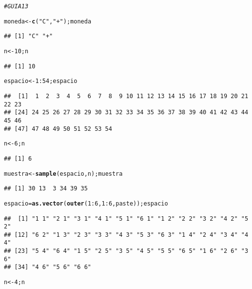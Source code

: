 \documentclass{article}\usepackage[]{graphicx}\usepackage[]{color}
\makeatletter
\newcommand{\hlnum}[1]{\textcolor[rgb]{0.686,0.059,0.569}{#1}}%
\newcommand{\hlstr}[1]{\textcolor[rgb]{0.192,0.494,0.8}{#1}}%
\newcommand{\hlcom}[1]{\textcolor[rgb]{0.678,0.584,0.686}{\textit{#1}}}%
\newcommand{\hlopt}[1]{\textcolor[rgb]{0,0,0}{#1}}%
\newcommand{\hlstd}[1]{\textcolor[rgb]{0.345,0.345,0.345}{#1}}%
\newcommand{\hlkwb}[1]{\textcolor[rgb]{0.69,0.353,0.396}{#1}}%
\newcommand{\hlkwd}[1]{\textcolor[rgb]{0.737,0.353,0.396}{\textbf{#1}}}%
\newenvironment{kframe}{%
 \def\at@end@of@kframe{}%
 \ifinner\ifhmode%
  \def\at@end@of@kframe{\end{minipage}}%
  \begin{minipage}{\columnwidth}%
 \fi\fi%
 \def\FrameCommand##1{\hskip\@totalleftmargin \hskip-\fboxsep
 \colorbox{shadecolor}{##1}\hskip-\fboxsep
     \hskip-\linewidth \hskip-\@totalleftmargin \hskip\columnwidth}%
 \MakeFramed {\advance\hsize-\width
   \@totalleftmargin\z@ \linewidth\hsize
   \@setminipage}}%
 {\par\unskip\endMakeFramed%
 \at@end@of@kframe}
\newenvironment{knitrout}{}{} %
\makeatother
\begin{document}
\begin{knitrout}
\color{fgcolor}\begin{kframe}
\begin{alltt}
\hlcom{# GUIA 13}

\hlstd{moneda} \hlkwb{<-} \hlkwd{c}\hlstd{(}\hlstr{"C"}\hlstd{,} \hlstr{"+"}\hlstd{); moneda}
\end{alltt}
\begin{verbatim}
## [1] "C" "+"
\end{verbatim}
\begin{alltt}
\hlstd{n} \hlkwb{<-} \hlnum{10}\hlstd{; n}
\end{alltt}
\begin{verbatim}
## [1] 10
\end{verbatim}
\begin{alltt}
\hlstd{espacio} \hlkwb{<-} \hlnum{1}\hlopt{:}\hlnum{54}\hlstd{;espacio}
\end{alltt}
\begin{verbatim}
##  [1]  1  2  3  4  5  6  7  8  9 10 11 12 13 14 15 16 17 18 19 20 21 22 23
## [24] 24 25 26 27 28 29 30 31 32 33 34 35 36 37 38 39 40 41 42 43 44 45 46
## [47] 47 48 49 50 51 52 53 54
\end{verbatim}
\begin{alltt}
\hlstd{n} \hlkwb{<-} \hlnum{6}\hlstd{; n}
\end{alltt}
\begin{verbatim}
## [1] 6
\end{verbatim}
\begin{alltt}
\hlstd{muestra} \hlkwb{<-} \hlkwd{sample}\hlstd{(espacio, n); muestra}
\end{alltt}
\begin{verbatim}
## [1] 30 13  3 34 39 35
\end{verbatim}
\begin{alltt}
\hlstd{espacio} \hlkwb{=} \hlkwd{as.vector}\hlstd{(}\hlkwd{outer}\hlstd{(}\hlnum{1}\hlopt{:}\hlnum{6}\hlstd{,} \hlnum{1}\hlopt{:}\hlnum{6}\hlstd{, paste)); espacio}
\end{alltt}
\begin{verbatim}
##  [1] "1 1" "2 1" "3 1" "4 1" "5 1" "6 1" "1 2" "2 2" "3 2" "4 2" "5 2"
## [12] "6 2" "1 3" "2 3" "3 3" "4 3" "5 3" "6 3" "1 4" "2 4" "3 4" "4 4"
## [23] "5 4" "6 4" "1 5" "2 5" "3 5" "4 5" "5 5" "6 5" "1 6" "2 6" "3 6"
## [34] "4 6" "5 6" "6 6"
\end{verbatim}
\begin{alltt}
\hlstd{n} \hlkwb{<-} \hlnum{4}\hlstd{; n}

\end{alltt}
\end{kframe}
\end{knitrout}
\end{document}

